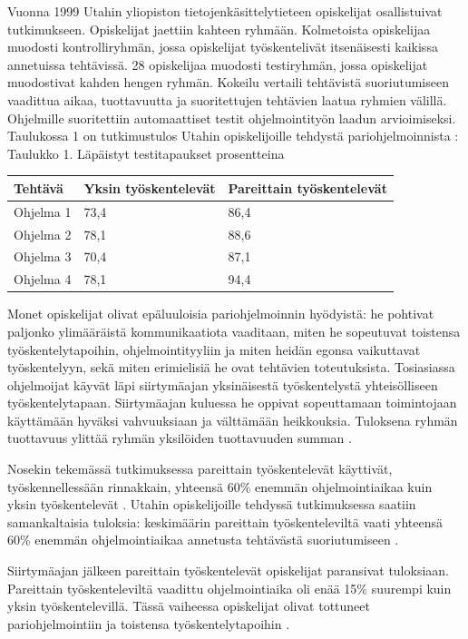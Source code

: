 \documentclass[finnish]{tktltiki2}
\theoremstyle{definition}
\theoremstyle{remark}
\begin{document}
Vuonna 1999 Utahin yliopiston tietojenkäsittelytieteen opiskelijat osallistuivat tutkimukseen. Opiskelijat jaettiin kahteen ryhmään. Kolmetoista opiskelijaa muodosti kontrolliryhmän, jossa opiskelijat työskentelivät itsenäisesti kaikissa annetuissa tehtävissä. 28 opiskelijaa muodosti testiryhmän, jossa opiskelijat muodostivat kahden hengen ryhmän. Kokeilu vertaili tehtävistä suoriutumiseen vaadittua aikaa, tuottavuutta ja suoritettujen tehtävien laatua ryhmien välillä. Ohjelmille suoritettiin automaattiset testit ohjelmointityön laadun arvioimiseksi. Taulukossa 1 on tutkimustulos Utahin opiskelijoille tehdystä pariohjelmoinnista \cite{WIL00}:
Taulukko 1. Läpäistyt testitapaukset prosentteina
\begin{center}
\begin{tabular}{ | l | l | p{5cm} |}
\hline
Tehtävä & Yksin työskentelevät & Pareittain työskentelevät \\ \hline
Ohjelma 1 & 73,4 & 86,4 \\ \hline
Ohjelma 2 & 78,1 & 88,6 \\ \hline
Ohjelma 3 & 70,4 & 87,1 \\ \hline
Ohjelma 4 & 78,1 & 94,4 \\ \hline
\end{tabular}
\end{center}

Monet opiskelijat olivat epäluuloisia pariohjelmoinnin hyödyistä: he pohtivat paljonko ylimääräistä kommunikaatiota vaaditaan, miten he sopeutuvat toistensa työskentelytapoihin, ohjelmointityyliin ja miten heidän egonsa vaikuttavat työskentelyyn, sekä miten erimielisiä he ovat tehtävien toteutuksista. Tosiasiassa ohjelmoijat käyvät läpi siirtymäajan yksinäisestä työskentelystä yhteisölliseen työskentelytapaan. Siirtymäajan kuluessa he oppivat sopeuttamaan toimintojaan käyttämään hyväksi vahvuuksiaan ja välttämään heikkouksia. Tuloksena ryhmän tuottavuus ylittää ryhmän yksilöiden tuottavuuden summan \cite{WIL00}.

Nosekin tekemässä tutkimuksessa pareittain työskentelevät käyttivät, työskennellessään rinnakkain, yhteensä 60\% enemmän ohjelmointiaikaa kuin yksin työskentelevät \cite{NOS98}. Utahin opiskelijoille tehdyssä tutkimuksessa saatiin samankaltaisia tuloksia: keskimäärin pareittain työskenteleviltä vaati yhteensä 60\% enemmän ohjelmointiaikaa annetusta tehtävästä suoriutumiseen \cite{WIL00}.

Siirtymäajan jälkeen pareittain työskentelevät opiskelijat paransivat tuloksiaan. Pareittain työskenteleviltä vaadittu ohjelmointiaika oli enää 15\% suurempi kuin yksin työskentelevillä. Tässä vaiheessa opiskelijat olivat tottuneet pariohjelmointiin ja toistensa työskentelytapoihin \cite{WIL00}.
\end{document}
